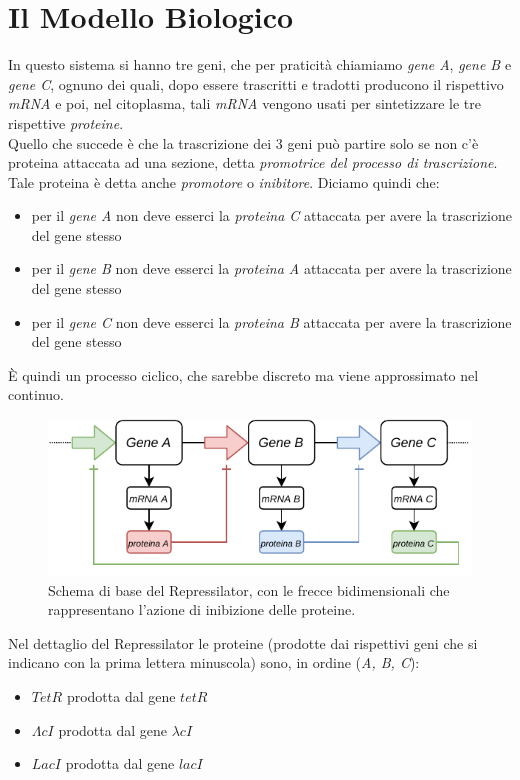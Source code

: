 \documentclass[a4paper,12pt, oneside]{book}
\begin{document}
\section{Il Modello Biologico}
In questo sistema si hanno tre geni, che per praticità chiamiamo \textit{gene
  A}, \textit{gene B} e \textit{gene C}, ognuno dei quali, dopo essere
trascritti e tradotti producono il rispettivo \textit{mRNA} e poi, nel
citoplasma, tali \textit{mRNA} vengono usati per sintetizzare le tre rispettive
\textit{proteine}. \\
Quello che succede è che la trascrizione dei 3 geni può partire solo se non c'è
proteina attaccata ad una sezione, detta \textit{promotrice del processo di
  trascrizione}. Tale proteina è detta anche \textit{promotore} o
\textit{inibitore}. Diciamo quindi che: 
\begin{itemize}
  \item per il \textit{gene A} non deve esserci la \textit{proteina C} attaccata
  per avere la trascrizione del gene stesso
  \item per il \textit{gene B} non deve esserci la \textit{proteina A} attaccata
  per avere la trascrizione del gene stesso
  \item per il \textit{gene C} non deve esserci la \textit{proteina B} attaccata
  per avere la trascrizione del gene stesso
\end{itemize}
È quindi un processo ciclico, che sarebbe discreto ma viene approssimato nel
continuo. 
\begin{figure}
  \centering
  \includegraphics[scale = 1]{img/repr.pdf}
  \caption{Schema di base del Repressilator, con le frecce bidimensionali che
    rappresentano l'azione di inibizione delle proteine.}
  \label{fig:repr}
\end{figure}
Nel dettaglio del Repressilator le proteine (prodotte dai rispettivi geni che si
indicano con la prima lettera minuscola) sono, in ordine (\textit{A, B, C}):
\begin{itemize}
  \item $TetR$ prodotta dal gene $tetR$
  \item $\Lambda cI$ prodotta dal gene $\lambda cI$
  \item $LacI$ prodotta dal gene $lacI$
\end{itemize}
\end{document}
